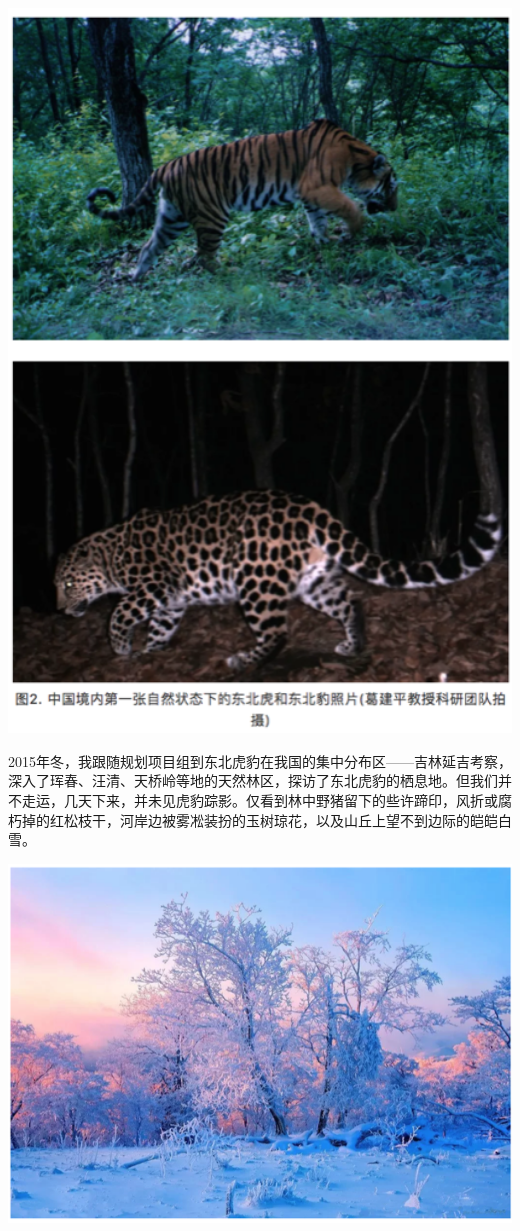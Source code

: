 \documentclass[
]{book}
\begin{document}
\includegraphics[width=5.79in]{images/tiger2}

2015年冬，我跟随规划项目组到东北虎豹在我国的集中分布区------吉林延吉考察，深入了珲春、汪清、天桥岭等地的天然林区，探访了东北虎豹的栖息地。但我们并不走运，几天下来，并未见虎豹踪影。仅看到林中野猪留下的些许蹄印，风折或腐朽掉的红松枝干，河岸边被雾凇装扮的玉树琼花，以及山丘上望不到边际的皑皑白雪。

\includegraphics[width=8.33in]{images/tiger3}
\end{document}
